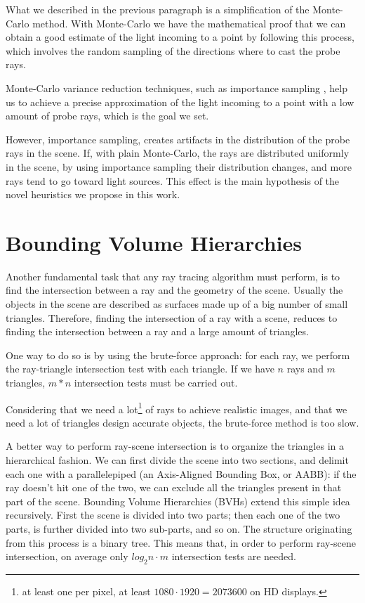 \documentclass{PoliMi_MasterThesis}
\begin{document}
What we described in the previous paragraph is a simplification of the Monte-Carlo method. With Monte-Carlo we have the mathematical proof that we can obtain a good estimate of the light incoming to a point by following this process, which involves the random sampling of the directions where to cast the probe rays.

Monte-Carlo variance reduction techniques, such as importance sampling \cite{importance_sampling}\cite{multi_light_sampling}, help us to achieve a precise approximation of the light incoming to a point with a low amount of probe rays, which is the goal we set.

However, importance sampling, creates artifacts in the distribution of the probe rays in the scene. If, with plain Monte-Carlo, the rays are distributed uniformly in the scene, by using importance sampling their distribution changes, and more rays tend to go toward light sources. This effect is the main hypothesis of the novel heuristics we propose in this work.

\section*{Bounding Volume Hierarchies}
Another fundamental task that any ray tracing algorithm must perform, is to find the intersection between a ray and the geometry of the scene. Usually the objects in the scene are described as surfaces made up of a big number of small triangles. Therefore, finding the intersection of a ray with a scene, reduces to finding the intersection between a ray and a large amount of triangles.

One way to do so is by using the brute-force approach: for each ray, we perform the ray-triangle intersection test with each triangle. If we have $n$ rays and $m$ triangles, $m*n$ intersection tests must be carried out.

Considering that we need a lot\footnote{at least one per pixel, at least $1080 \cdot 1920 = 2073600$ on HD displays.} of rays to achieve realistic images, and that we need a lot of triangles design accurate objects, the brute-force method is too slow.

A better way to perform ray-scene intersection is to organize the triangles in a hierarchical fashion. We can first divide the scene into two sections, and delimit each one with a parallelepiped (an Axis-Aligned Bounding Box, or AABB): if the ray doesn't hit one of the two, we can exclude all the triangles present in that part of the scene. Bounding Volume Hierarchies (BVHs) extend this simple idea recursively. First the scene is divided into two parts; then each one of the two parts, is further divided into two sub-parts, and so on. The structure originating from this process is a binary tree. This means that, in order to perform ray-scene intersection, on average only $log_2 n \cdot m$ intersection tests are needed.
\end{document}
